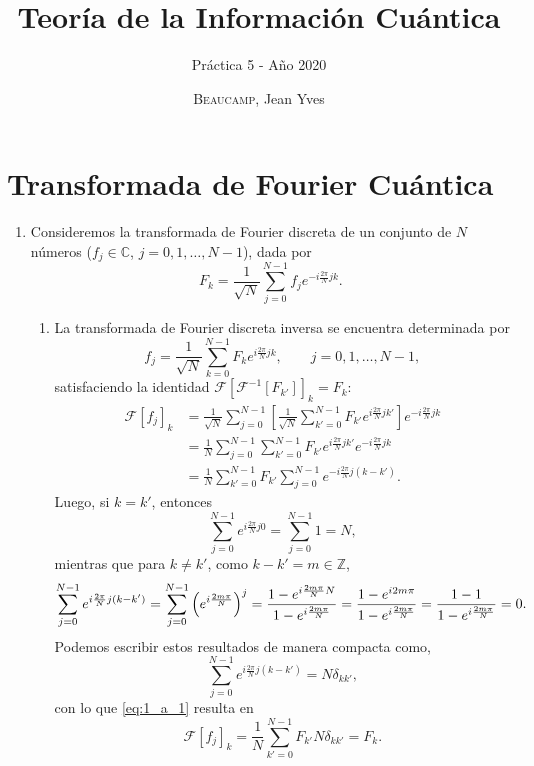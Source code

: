 \documentclass{scrartcl}
\title{Teoría de la Información Cuántica}
\subtitle{Práctica 5 - Año 2020}
\author{\textsc{Beaucamp}, Jean Yves}
\date{}
\newcommand{\inv}[1]{\frac{1}{#1}}
\newcommand{\complexSet}{\mathbb{C}}
\DeclareRobustCommand{\[}{\begin{equation}}
\DeclareRobustCommand{\]}{\end{equation}}
\begin{document}
\maketitle

\section{Transformada de Fourier Cuántica}
\begin{enumerate}
    
    \item Consideremos la transformada de Fourier discreta de un conjunto de $N$ números ($f_j \in \complexSet$, $j = 0, 1, \dots, N-1$), dada por
    \[  F_k = \inv{\sqrt{N}} \sum_{j = 0}^{N-1} f_j e^{-i\frac{2\pi}{N} jk}. \]
    
    \begin{enumerate}
        \item La transformada de Fourier discreta inversa se encuentra determinada por
        \[ f_j = \inv{\sqrt{N}} \sum_{k = 0}^{N-1} F_k e^{i\frac{2\pi}{N} jk}, \quad \quad j = 0, 1, \dots, N - 1, \]
        satisfaciendo la identidad $\mathcal{F}[\mathcal{F}^{-1}[F_{k'}]]_k = F_k$:
        \begin{align}
            \mathcal{F}[f_j]_k &= \inv{\sqrt{N}} \sum_{j = 0}^{N-1} \left[ \inv{\sqrt{N}} \sum_{k' = 0}^{N-1} F_{k'} e^{i\frac{2\pi}{N} jk'} \right] e^{-i\frac{2\pi}{N} jk} \\
                &= \inv{N} \sum_{j = 0}^{N-1} \sum_{k' = 0}^{N-1} F_{k'} e^{i\frac{2\pi}{N} jk'} e^{-i\frac{2\pi}{N} jk} \\
                &= \inv{N} \sum_{k' = 0}^{N-1} F_{k'} \sum_{j = 0}^{N-1} e^{-i\frac{2\pi}{N} j (k-k')}. \label{eq:1_a_1}
        \end{align}
        Luego, si $k = k'$, entonces
        \[ \sum_{j = 0}^{N - 1} e^{i \frac{2\pi}{N} j 0} = \sum_{j = 0}^{N - 1} 1 = N, \]
        mientras que para $k \neq k'$, como $k - k' = m \in \mathds{Z}$,
        \[ \sum_{j = 0}^{N - 1} e^{i \frac{2\pi}{N} j (k - k')} = \sum_{j = 0}^{N - 1} \qty(e^{i \frac{2m\pi}{N}})^j = \frac{1 - e^{i \frac{2m\pi}{N} N}}{1 - e^{i \frac{2m\pi}{N}}} = \frac{1 - e^{i 2m\pi}}{1 - e^{i \frac{2m\pi}{N}}} = \frac{1 - 1}{1 - e^{i \frac{2m\pi}{N}}} = 0. \]
        Podemos escribir estos resultados de manera compacta como,
        \[ \sum_{j = 0}^{N - 1} e^{i \frac{2\pi}{N} j (k - k')} = N \delta_{k k'}, \]
        con lo que \eqref{eq:1_a_1} resulta en
        \[ \mathcal{F}[f_j]_k = \inv{N} \sum_{k' = 0}^{N-1} F_{k'} N \delta_{k k'} = F_k. \]
        

\end{enumerate}
\end{enumerate}
\end{document}
